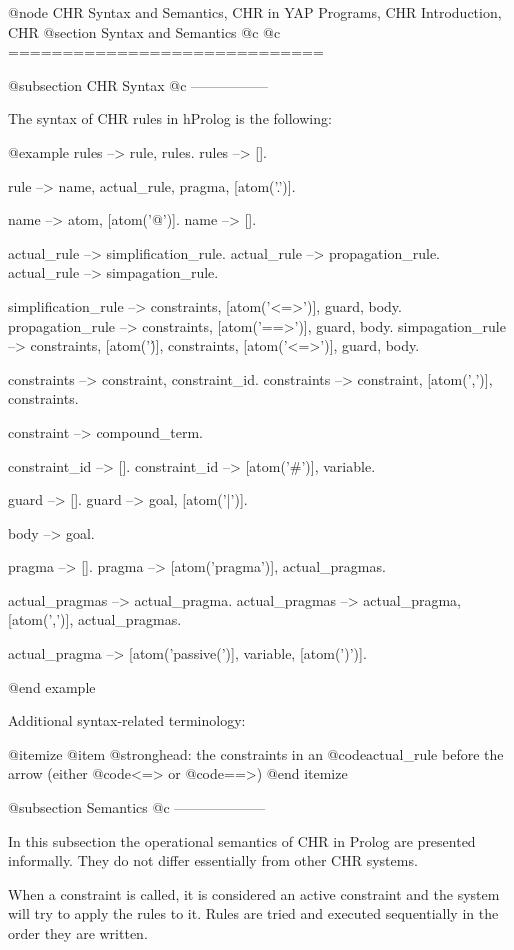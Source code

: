 @node CHR Syntax and Semantics, CHR in YAP Programs, CHR Introduction, CHR
@section Syntax and Semantics
@c		\label{sec:SyntaxAndSemantics}
@c =============================

@subsection CHR Syntax
@c -----------------

The syntax of CHR rules in hProlog is the following:

@example
rules --> rule, rules.
rules --> [].

rule --> name, actual_rule, pragma, [atom('.')].

name --> atom, [atom('@')].
name --> [].

actual_rule --> simplification_rule.
actual_rule --> propagation_rule.
actual_rule --> simpagation_rule.

simplification_rule --> constraints, [atom('<=>')], guard, body.
propagation_rule --> constraints, [atom('==>')], guard, body.
simpagation_rule --> constraints, [atom('\')], constraints, [atom('<=>')], 
                     guard, body.

constraints --> constraint, constraint_id.
constraints --> constraint, [atom(',')], constraints.

constraint --> compound_term.

constraint_id --> [].
constraint_id --> [atom('#')], variable.

guard --> [].
guard --> goal, [atom('|')].

body --> goal.

pragma --> [].
pragma --> [atom('pragma')], actual_pragmas.

actual_pragmas --> actual_pragma.
actual_pragmas --> actual_pragma, [atom(',')], actual_pragmas.

actual_pragma --> [atom('passive(')], variable, [atom(')')].

@end example

Additional syntax-related terminology:

@itemize
@item @strong{head:} the constraints in an @code{actual_rule} before
                     the arrow (either @code{<=>} or @code{==>})
@end itemize

@subsection Semantics
@c --------------------

In this subsection the operational semantics of CHR in Prolog are presented
informally. They do not differ essentially from other CHR systems.

When a constraint is called, it is considered an active constraint and
the system will try to apply the rules to it. Rules are tried and executed
sequentially in the order they are written. 

